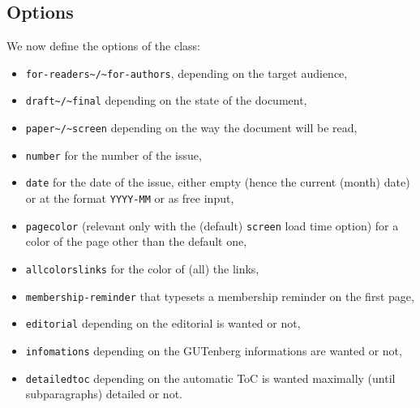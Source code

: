 \documentclass{letgut}
\begin{document}
\subsection{Options}
\label{ImplementationOptions-imhg55h0jlj0}
We now define the options of the class:

\begin{itemize}
\item \lstinline+for-readers~/~for-authors+, depending on the target audience,
\item \lstinline+draft~/~final+ depending on the state of the document,
\item \lstinline+paper~/~screen+ depending on the way the document will be read,
\item \lstinline+number+ for the number of the issue,
\item \lstinline+date+ for the date of the issue, either empty (hence the current (month)
date) or at the format \lstinline+YYYY-MM+ or as free input,
\item \lstinline+pagecolor+ (relevant only with the (default) \lstinline+screen+ load time option) for
a color of the page other than the default one,
\item \lstinline+allcolorslinks+ for the color of (all) the links,
\item \lstinline+membership-reminder+ that typesets a membership reminder on the first page,
\item \lstinline+editorial+ depending on the editorial is wanted or not,
\item \lstinline+infomations+ depending on the GUTenberg informations are wanted or not,
\item \lstinline+detailedtoc+ depending on the automatic ToC is wanted maximally (until
subparagraphs) detailed or not.
\end{itemize}
\end{document}
